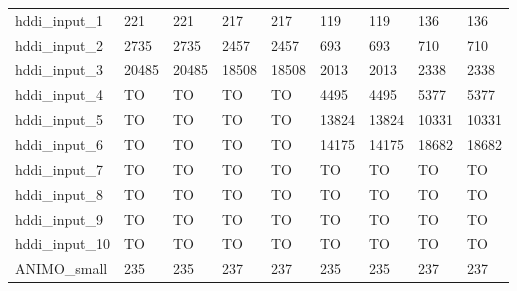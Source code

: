 \begin{table}
\begin{adjustbox}{max totalheight=\textheight}
\begin{tabular}{|l|llllllll|}
    hddi\_input\_1     & 221      & 221      & 217      & 217      & 119   & 119   & 136   & 136   \\
    hddi\_input\_2     & 2735     & 2735     & 2457     & 2457     & 693   & 693   & 710   & 710   \\
    hddi\_input\_3     & 20485    & 20485    & 18508    & 18508    & 2013  & 2013  & 2338  & 2338  \\
    hddi\_input\_4     & TO       & TO       & TO       & TO       & 4495  & 4495  & 5377  & 5377  \\
    hddi\_input\_5     & TO       & TO       & TO       & TO       & 13824 & 13824 & 10331 & 10331 \\
    hddi\_input\_6     & TO       & TO       & TO       & TO       & 14175 & 14175 & 18682 & 18682 \\
    hddi\_input\_7     & TO       & TO       & TO       & TO       & TO    & TO    & TO    & TO    \\
    hddi\_input\_8     & TO       & TO       & TO       & TO       & TO    & TO    & TO    & TO    \\
    hddi\_input\_9     & TO       & TO       & TO       & TO       & TO    & TO    & TO    & TO    \\
    hddi\_input\_10    & TO       & TO       & TO       & TO       & TO    & TO    & TO    & TO    \\ \hline
    ANIMO\_small       & 235      & 235      & 237      & 237      & 235   & 235   & 237   & 237   \\ \hline
    \end{tabular}
\end{adjustbox}
\end{table}



